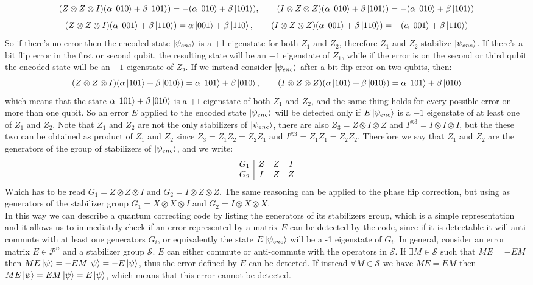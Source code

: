 \documentclass{article}
\begin{document}
	\[(Z\otimes Z \otimes I)(\alpha\ket{010} + \beta\ket{101}) = -(\alpha\ket{010} + \beta\ket{101}),\qquad (I\otimes Z \otimes Z)(\alpha\ket{010} + \beta\ket{101}) = -(\alpha\ket{010} + \beta\ket{101})\]
	\[(Z\otimes Z \otimes I)(\alpha\ket{001} + \beta\ket{110}) = \alpha\ket{001} + \beta\ket{110},\qquad (I\otimes Z \otimes Z)(\alpha\ket{001} + \beta\ket{110}) = -(\alpha\ket{001} + \beta\ket{110})\]
	So if there's no error then the encoded state $\ket{\psi_{enc}}$ is a +1 eigenstate for both $Z_1$ and $Z_2$, therefore $Z_1$ and $Z_2$ stabilize $\ket{\psi_{enc}}$. If there's a bit flip error in the first or second qubit, the resulting state will be an $-1$ eigenstate of $Z_1$, while if the error is on the second or third qubit the encoded state will be an $-1$ eigenstate of $Z_2$. If we instead consider $\ket{\psi_{enc}}$ after a bit flip error on two qubits, then:
	\[(Z\otimes Z \otimes I)(\alpha\ket{101} + \beta\ket{010}) = \alpha\ket{101} + \beta\ket{010},\qquad (I\otimes Z \otimes Z)(\alpha\ket{101} + \beta\ket{010}) = \alpha\ket{101} + \beta\ket{010} \]
	which means that the state $\alpha\ket{101} + \beta\ket{010}$ is a $+1$ eigenstate of both $Z_1$ and $Z_2$, and the same thing holds for every possible error on more than one qubit. So an error $E$ applied to the encoded state $\ket{\psi_{enc}}$ will be detected only if $E\ket{\psi_{enc}}$ is a $-1$ eigenstate of at least one of $Z_1$ and $Z_2$. Note that $Z_1$ and $Z_2$ are not the only stabilizers of $\ket{\psi_{enc}}$, there are also $Z_3 = Z \otimes I \otimes Z$ and $I^{\otimes3} = I\otimes I \otimes I$, but the these two can be obtained as product of $Z_1$ and $Z_2$ since $Z_3 = Z_1Z_2 = Z_2Z_1$ and $I^{\otimes3} = Z_1Z_1 = Z_2Z_2$. Therefore we say that $Z_1$ and $Z_2$ are the generators of the group of stabilizers of $\ket{\psi_{enc}}$, and we write:
	\[
	\begin{array}{c|c c c}
		G_1 & Z & Z & I \\
		G_2 & I & Z & Z \\
	\end{array}
	\]
	Which has to be read $G_1 = Z\otimes Z \otimes I$ and $G_2 = I\otimes Z \otimes Z$.
	The same reasoning can be applied to the phase flip correction, but using as generators of the stabilizer group $G_1 = X\otimes X \otimes I$ and $G_2 = I \otimes X \otimes X$.\\
	In this way we can describe a quantum correcting code by listing the generators of its stabilizers group, which is a simple representation and it allows us to immediately check if an error represented by a matrix $E$ can be detected by the code, since if it is detectable it will anti-commute with at least one generators $G_i$, or equivalently the state $E\ket{\psi_{enc}}$ will be a -1 eigenstate of $G_i$. In general, consider an error matrix $E \in \mathcal{P}^n$ and a stabilizer group $\mathcal{S}$. $E$ can either commute or anti-commute with the operators in $\mathcal{S}$. If $\exists M \in \mathcal{S} \text{ such that } ME = -EM$ then $ME\ket{\psi} = -EM\ket{\psi} = -E\ket{\psi}$, thus the error defined by $E$ can be detected. If instead $\forall M \in \mathcal{S} \text{ we have } ME = EM$ then $ME\ket{\psi} = EM\ket{\psi} = E\ket{\psi}$, which means that this error cannot be detected.\\
\end{document}
